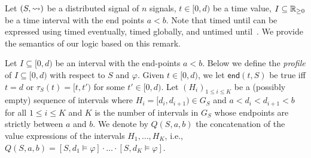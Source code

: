 Let $(S, {\rightsquigarrow})$ be a distributed signal of $n$ signals, $t \in [0,d)$ be a time value, $I \subseteq \mathbb{R}_{\geq 0}$ be a time interval with the end points $a < b$.
Note that timed until can be expressed using timed eventually, timed globally, and untimed until~\cite{DBLP:journals/sttt/MalerN13}.
We provide the semantics of our logic based on this remark. %

Let $I \subseteq [0,d)$ be an interval with the end-points $a < b$.
Below we define the \emph{profile} of $I \subseteq [0,d)$ with respect to $S$ and $\varphi$.
Given $t \in [0,d)$, we let $\mathsf{end}(t, S)$ be true iff $t=d$ or $\tau_S(t) = [t, t')$ for some $t' \in [0,d)$.
Let $(H_i)_{1 \leq i \leq K}$ be a (possibly empty) sequence of intervals where $H_i = [d_i, d_{i+1}) \in G_S$ and $a < d_i < d_{i+1} < b$ for all $1 \leq i \leq K$ and $K$ is the number of intervals in $G_S$ whose endpoints are strictly between $a$ and $b$.
We denote by $Q(S, a, b)$ the concatenation of the value expressions of the intervals $H_1, \ldots, H_K$, i.e., $Q(S, a, b) = [S, d_1 \models \varphi] \cdot \ldots \cdot [S, d_K \models \varphi]$.


